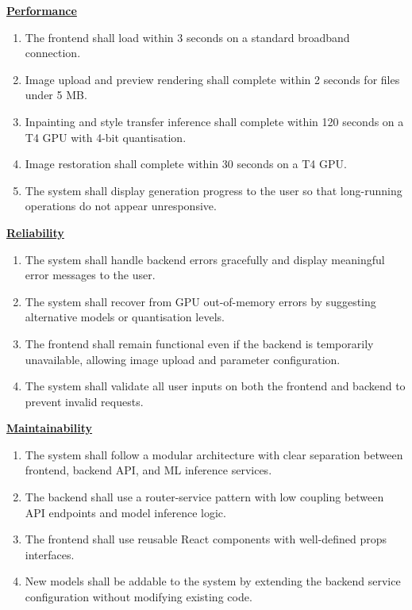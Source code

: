 \documentclass[12pt,a4paper]{report}
\begin{document}
\vspace{0.5em}
\noindent\underline{\textbf{Performance}}

\begin{enumerate}[label=\textbf{NFR-\arabic*}.,start=7]
    \item The frontend shall load within 3 seconds on a standard broadband connection.
    \item Image upload and preview rendering shall complete within 2 seconds for files under 5 MB.
    \item Inpainting and style transfer inference shall complete within 120 seconds on a T4 GPU with 4-bit quantisation.
    \item Image restoration shall complete within 30 seconds on a T4 GPU.
    \item The system shall display generation progress to the user so that long-running operations do not appear unresponsive.
\end{enumerate}

\vspace{0.5em}
\noindent\underline{\textbf{Reliability}}

\begin{enumerate}[label=\textbf{NFR-\arabic*}.,start=12]
    \item The system shall handle backend errors gracefully and display meaningful error messages to the user.
    \item The system shall recover from GPU out-of-memory errors by suggesting alternative models or quantisation levels.
    \item The frontend shall remain functional even if the backend is temporarily unavailable, allowing image upload and parameter configuration.
    \item The system shall validate all user inputs on both the frontend and backend to prevent invalid requests.
\end{enumerate}

\vspace{0.5em}
\noindent\underline{\textbf{Maintainability}}

\begin{enumerate}[label=\textbf{NFR-\arabic*}.,start=16]
    \item The system shall follow a modular architecture with clear separation between frontend, backend API, and ML inference services.
    \item The backend shall use a router-service pattern with low coupling between API endpoints and model inference logic.
    \item The frontend shall use reusable React components with well-defined props interfaces.
    \item New models shall be addable to the system by extending the backend service configuration without modifying existing code.
\end{enumerate}
\end{document}
